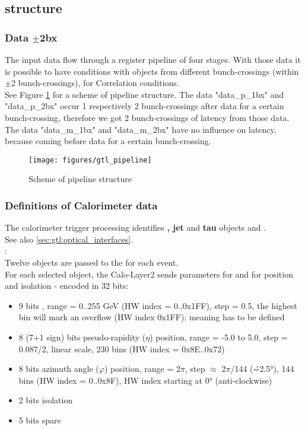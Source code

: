 \clearpage

\subsection{\ugtl structure}
\label{sec:gtl:mgtl_structure}

\subsubsection{Data $\pm$2bx}
\label{sec:gtl:data_p_m_2bx}

The \ugtl input data flow through a register pipeline of four stages. With those data it is possible to have conditions with objects from
different bunch-crossings (within $\pm$2 bunch-crossings), \egamma for Correlation conditions.\\
See Figure \ref{fig:gtl:gtl_pipeline} for a scheme of \ugtl pipeline structure. The data "data\_p\_1bx" and "data\_p\_2bx" occur 1 respectively 2 bunch-crossings
after data for a certain bunch-crossing, therefore we got 2 bunch-crossings of latency from those data. The data "data\_m\_1bx" and "data\_m\_2bx" have no influence
on latency, because coming before data for a certain bunch-crossing.

\begin{figure}[htb]
\centering
\texttt{[image: figures/gtl\_pipeline]}
\caption{Scheme of \ugtl pipeline structure}
\label{fig:gtl:gtl_pipeline}
\end{figure}


\subsubsection{Definitions of Calorimeter data}
\label{sec:gtl:calorimeter_data}

The calorimeter trigger processing identifies \textbf{\egamma, jet} and \textbf{tau} objects and \textbf{\esums}.\\
See also \ref{sec:gtl:optical_interfaces}.\\

\textbf{\Egamma}:\\ Twelve objects are passed to the \ugt for each event.\\
For each selected object, the Calo-Layer2 sends parameters for \pt and for position and isolation - encoded in 32 bits:
\begin{itemize}
\item 9 bits \pt, range = 0..255 GeV (HW index = 0..0x1FF), step = 0.5, the highest bin will mark an overflow (HW index 0x1FF): meaning has to be defined
\item 8 (7+1 sign) bits pseudo-rapidity ($\eta$) position, range = -5.0 to 5.0, step = 0.087/2, linear scale, 230 bins (HW index = 0x8E..0x72)
\item 8 bits azimuth angle ($\varphi$) position, range = 2$\pi$, step $\approx$ 2$\pi$/144 (\^=2.5°), 144 bins (HW index = 0..0x8F), HW index starting at 0° (anti-clockwise)
\item 2 bits isolation
\item 5 bits spare
\end{itemize}

